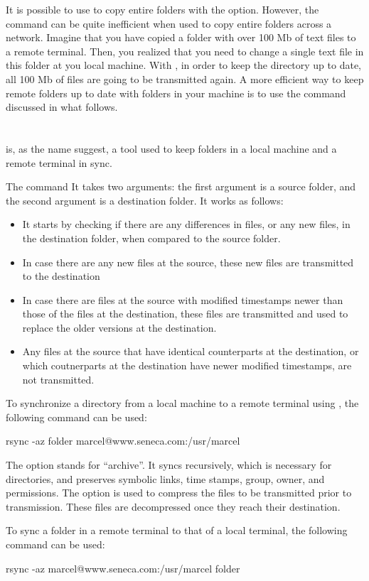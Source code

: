 It is possible to use  to copy entire folders with the  option. However, the  command can be quite inefficient when used to copy entire folders across a network. Imagine that you have copied a folder with over 100 Mb of text files to a remote terminal. Then, you realized that you need to change a single text file in this folder at you local machine. With , in order to keep the directory up to date, all 100 Mb of files are going to be transmitted again. A more efficient way to keep remote folders up to date with folders in your machine is to use the  command discussed in what follows.

\section{}

 is, as the name suggest, a tool used to keep folders in a local machine and a remote terminal in sync. 

The  command It takes two arguments: the first argument is a source folder, and the second argument is a destination folder. It works as follows:
\begin{itemize}
\item It starts by checking if there are any differences in files, or any new files, in the destination folder, when compared to the source folder.
\item In case there are any new files at the source, these new files are transmitted to the destination
\item In case there are files at the source with modified timestamps newer than those of the files at the destination, these files are transmitted and used to replace the older versions at the destination.
\item Any files at the source that have identical counterparts at the destination, or which coutnerparts at the destination have newer modified timestamps, are not transmitted.
\end{itemize}

To synchronize a directory from a local machine to a remote terminal using , the following command can be used:

\begin{command_line}[make]
rsync -az folder marcel@www.seneca.com:/usr/marcel
\end{command_line}

The  option stands for ``archive''. It syncs recursively, which is necessary for directories, and preserves symbolic links, time stamps, group, owner, and permissions. The  option is used to compress the files to be transmitted prior to transmission. These files are decompressed once they reach their  destination.

To sync a folder in a remote terminal to that of a local terminal, the following command can be used:

\begin{command_line}[make]
rsync -az marcel@www.seneca.com:/usr/marcel folder
\end{command_line}